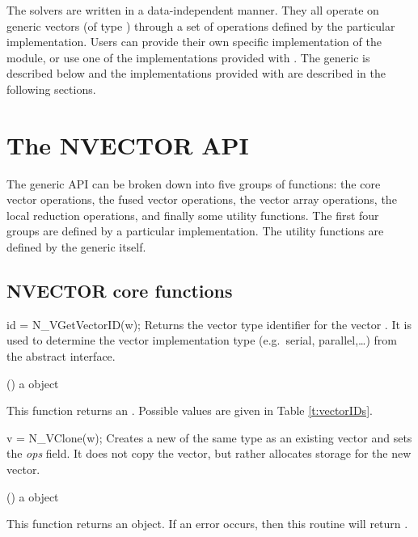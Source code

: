 %
The {\sundials} solvers are written in a data-independent manner.
They all operate on generic vectors (of type ) through a set of
operations defined by the particular {\nvector} implementation.
Users can provide their own specific implementation of the {\nvector}
module, or use one of the implementations provided with {\sundials}.
The generic {\nvector} is described below and the implementations
provided with {\sundials} are described in the following sections.

\section{The NVECTOR API}
\label{s:nvector_api}

The generic {\nvector} API can be broken down into five groups of functions:
the core vector operations, the fused vector operations, the vector array
operations, the local reduction operations, and finally some utility functions.
The first four groups are defined by a particular {\nvector} implementation.
The utility functions are defined by the generic {\nvector} itself.

\subsection{NVECTOR core functions}\label{ss:nvecops}

{
  id = N\_VGetVectorID(w);
}
{
  Returns the vector type identifier for the vector . It is used to determine the
  vector implementation type (e.g.~serial, parallel,\ldots) from the abstract
   interface.
}
{
  \begin{args}[w]
  \item[w] () a {\nvector} object
  \end{args}
}
{
  This function returns an . Possible values are given in Table
  \ref{t:vectorIDs}.
}
{}

{
  v = N\_VClone(w);
}
{
  Creates a new  of the same type as an existing vector  and sets the
  {\em ops} field. It does not copy the vector, but rather allocates storage for the new vector.
}
{
  \begin{args}[w]
  \item[w] () a {\nvector} object
  \end{args}
}
{
  This function returns an  object. If an error occurs, then this
  routine will return .
}
{}

